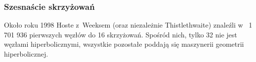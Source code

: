 
\subsubsection{Szesnaście skrzyżowań}
Około roku 1998 Hoste z~Weeksem (oraz niezależnie Thistlethwaite) znaleźli w~\cite{thistlethwaite98} 1 701 936 pierwszych węzłów do 16 skrzyżowań.
%
%
%
Spośród nich, tylko 32 nie jest węzłami hiperbolicznymi, wszystkie pozostałe poddają się maszynerii geometrii hiperbolicznej.

